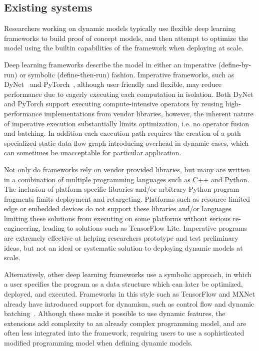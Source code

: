 \subsection{Existing systems}
\label{sec:background:existing}
Researchers working on dynamic models typically use flexible deep learning frameworks to build proof of concept models, and then attempt to optimize the model using the builtin capabilities of the framework when deploying at scale.

Deep learning frameworks describe the model in either an imperative (define-by-run) or symbolic (define-then-run) fashion.
Imperative frameworks, such as DyNet~\citep{dynet} and PyTorch~\citep{pytorch}, although user friendly and flexible, may reduce performance due to eagerly executing each computation in isolation.
Both DyNet and PyTorch support executing compute-intensive operators by reusing high-performance implementations from vendor libraries, however, the inherent nature of imperative execution substantially limits optimization, i.e. no operator fusion and batching.
In addition each execution path requires the creation of a path specialized static data flow graph introducing overhead in dynamic cases, which can sometimes be unacceptable for particular application.

Not only do frameworks rely on vendor provided libraries, but many are written in a combination of multiple programming languages such as C++ and Python. The inclusion of platform specific libraries and/or arbitrary Python program fragments limits deployment and retargeting.
Platforms such as resource limited edge or embedded devices do not support these libraries and/or languages limiting these solutions from executing on some platforms without serious re-engineering, leading to solutions such as TensorFlow Lite.
Imperative programs are extremely effective at helping researchers prototype and test preliminary ideas, but not an ideal or systematic solution to deploying dynamic models at scale.

Alternatively, other deep learning frameworks use a symbolic approach, in which a user specifies the program as a data structure which can later be optimized, deployed, and executed. Frameworks in this style such as TensorFlow and MXNet already have introduced support for dynamism, such as control flow and dynamic batching~\citep{yu2018dynamic, tf_fold, mxnet-control}. Although these make it possible to use dynamic features, the extensions add complexity to an already complex programming model, and are often less integrated into the framework, requiring users to use a sophisticated modified programming model when defining dynamic models.

